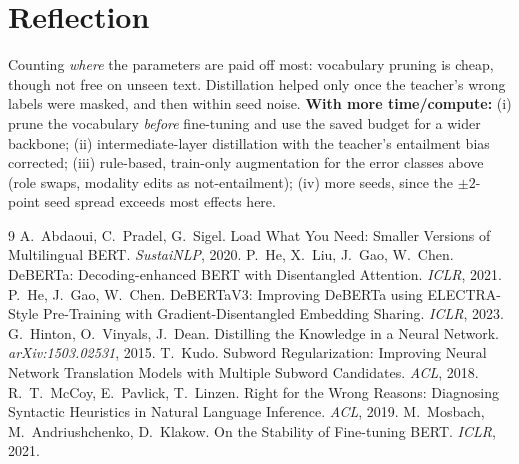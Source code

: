 \documentclass[11pt]{article}
\begin{document}
\section{Reflection}
Counting \emph{where} the parameters are paid off most: vocabulary pruning is cheap, though not free on unseen text. Distillation helped only once the teacher's wrong labels were masked, and then within seed noise. \textbf{With more time/compute:} (i) prune the vocabulary \emph{before} fine-tuning and use the saved budget for a wider backbone; (ii) intermediate-layer distillation with the teacher's entailment bias corrected; (iii) rule-based, train-only augmentation for the error classes above (role swaps, modality edits as not-entailment); (iv) more seeds, since the $\pm2$-point seed spread exceeds most effects here.

\small
\begin{thebibliography}{9}\setlength{\itemsep}{0pt}
 A.~Abdaoui, C.~Pradel, G.~Sigel. Load What You Need: Smaller Versions of Multilingual BERT. \emph{SustaiNLP}, 2020.
 P.~He, X.~Liu, J.~Gao, W.~Chen. DeBERTa: Decoding-enhanced BERT with Disentangled Attention. \emph{ICLR}, 2021.
 P.~He, J.~Gao, W.~Chen. DeBERTaV3: Improving DeBERTa using ELECTRA-Style Pre-Training with Gradient-Disentangled Embedding Sharing. \emph{ICLR}, 2023.
 G.~Hinton, O.~Vinyals, J.~Dean. Distilling the Knowledge in a Neural Network. \emph{arXiv:1503.02531}, 2015.
 T.~Kudo. Subword Regularization: Improving Neural Network Translation Models with Multiple Subword Candidates. \emph{ACL}, 2018.
 R.~T.~McCoy, E.~Pavlick, T.~Linzen. Right for the Wrong Reasons: Diagnosing Syntactic Heuristics in Natural Language Inference. \emph{ACL}, 2019.
 M.~Mosbach, M.~Andriushchenko, D.~Klakow. On the Stability of Fine-tuning BERT. \emph{ICLR}, 2021.
\end{thebibliography}
\end{document}
